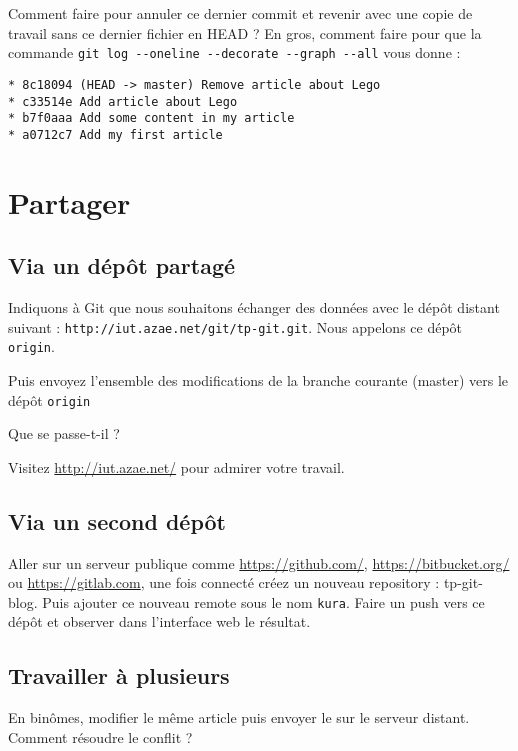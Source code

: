 \documentclass[a4paper]{article}
\begin{document}
Comment faire pour annuler ce dernier commit et revenir avec une copie de travail sans ce dernier fichier en HEAD ? En gros, comment faire pour que la commande \verb|git log --oneline --decorate --graph --all| vous donne :
\begin{verbatim}
* 8c18094 (HEAD -> master) Remove article about Lego
* c33514e Add article about Lego
* b7f0aaa Add some content in my article
* a0712c7 Add my first article
\end{verbatim}

\section{Partager}

\subsection{Via un dépôt partagé}

Indiquons à Git que nous souhaitons échanger des données avec le dépôt distant suivant : \verb|http://iut.azae.net/git/tp-git.git|. Nous appelons ce dépôt \verb|origin|.

Puis envoyez l'ensemble des modifications de la branche courante (master) vers le dépôt \verb|origin|

Que se passe-t-il ?

Visitez \url{http://iut.azae.net/} pour admirer votre travail.

\subsection{Via un second dépôt}

Aller sur un serveur publique comme \url{https://github.com/}, \url{https://bitbucket.org/} ou \url{https://gitlab.com}, une fois connecté créez un nouveau repository : tp-git-blog. Puis ajouter ce nouveau remote sous le nom \verb|kura|. Faire un push vers ce dépôt et observer dans l'interface web le résultat.

\subsection{Travailler à plusieurs}
En binômes, modifier le même article puis envoyer le sur le serveur distant. Comment résoudre le conflit ?
\end{document}
